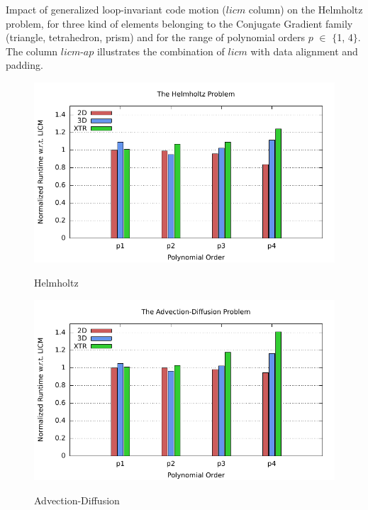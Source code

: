 \documentclass[conference]{IEEEtran}
\begin{document}
\begin{table}[t]\normalsize
\massmatrixtwodresultsnorms
\label{table:perf-results-licm-helmholtz}
\caption{Impact of generalized loop-invariant code motion ($licm$ column) on the Helmholtz problem, for three kind of elements belonging to the Conjugate Gradient family (triangle, tetrahedron, prism) and for the range of polynomial orders $p$ $\in$ $\lbrace$1, 4$\rbrace$. The column $licm$-$ap$ illustrates the combination of $licm$ with data alignment and padding.}
\end{table}

\begin{figure}[h]
\centerline{\includegraphics[scale=0.7]{Pictures/helmholtz-normalized.pdf}
\label{fig_first_case}}
\caption{Helmholtz}
\end{figure}

\begin{figure}[h]
\centerline{\includegraphics[scale=0.7]{Pictures/advdiff-normalized.pdf}
\label{fig_first_case}}
\caption{Advection-Diffusion}
\end{figure}
\end{document}
